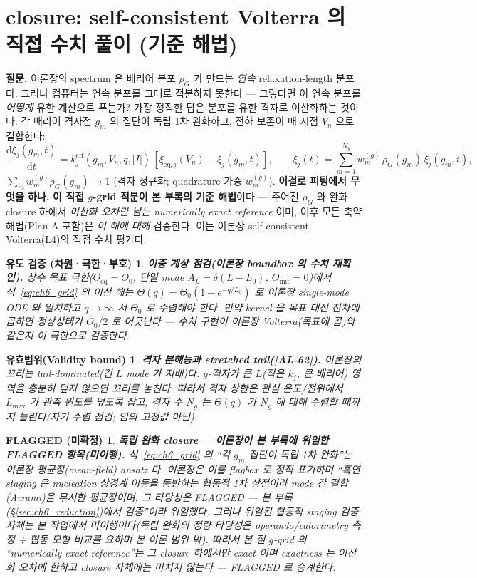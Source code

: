 \documentclass[11pt,a4paper]{article}
\newtheorem*{boundbox}{유효범위(Validity bound)}
\newtheorem*{flagbox}{FLAGGED (미확정)}
\newtheorem*{verifybox}{유도 검증 (차원·극한·부호)}
\newcommand{\dd}{\mathrm{d}}
\newcommand{\eff}{\mathrm{eff}}
\newcommand{\eq}{\mathrm{eq}}
\newcommand{\AL}[1]{\textsf{[AL-#1]}}
\begin{document}
\section{closure: self-consistent Volterra 의 직접 수치 풀이 (기준 해법)}\label{sec:ch6_grid}
\textbf{질문.} 이론장의 spectrum 은 배리어 분포 $\rho_G$ 가 만드는 \emph{연속} relaxation-length 분포다. 그러나
컴퓨터는 연속 분포를 그대로 적분하지 못한다 — 그렇다면 이 연속 분포를 \emph{어떻게} 유한 계산으로 푸는가? 가장
정직한 답은 분포를 유한 격자로 이산화하는 것이다. 각 배리어 격자점 $g_m$ 의 집단이 독립 1차 완화하고, 전하
보존이 매 시점 $V_n$ 으로 결합한다:
\begin{equation}
\frac{\dd\xi_j(g_m,t)}{\dd t}=k_j^{\eff}(g_m,V_n,q,|I|)\,[\xi_{\eq,j}(V_n)-\xi_j(g_m,t)],\qquad
\xi_j(t)=\sum_{m=1}^{N_g}w_m^{(g)}\,\rho_G(g_m)\,\xi_j(g_m,t),
\label{eq:ch6_grid}
\end{equation}
$\sum_m w_m^{(g)}\rho_G(g_m)\to1$ (격자 정규화; quadrature 가중 $w_m^{(g)}$).
\textbf{이걸로 피팅에서 무엇을 하나.} \textbf{이 직접 $g$-grid 적분이 본 부록의 기준 해법}이다 — 주어진
$\rho_G$ 와 완화 closure 하에서 \emph{이산화 오차만 남는 numerically exact reference} 이며, 이후 모든 축약
해법(Plan A 포함)은 \emph{이 해에 대해} 검증한다. 이는 이론장 self-consistent Volterra(L4)의 직접 수치 평가다.
\begin{verifybox}
\textbf{이중 계상 점검(이론장 boundbox 의 수치 재확인).} 상수 목표 극한($\Theta_\eq=\Theta_0$, 단일 mode
$A_L=\delta(L-L_0)$, $\Theta_\mathrm{init}=0$)에서 식~\eqref{eq:ch6_grid} 의 이산 해는 $\Theta(q)=\Theta_0
(1-e^{-q/L_0})$ 로 이론장 single-mode ODE 와 일치하고 $q\to\infty$ 서 $\Theta_0$ 로 수렴해야 한다. 만약 kernel 을
\emph{목표} 대신 \emph{잔차}에 곱하면 정상상태가 $\Theta_0/2$ 로 어긋난다 — 수치 구현이 이론장 Volterra(목표에
곱)와 같은지 이 극한으로 검증한다.
\end{verifybox}
\begin{boundbox}
\textbf{격자 분해능과 stretched tail(\AL{62}).} 이론장의 꼬리는 \emph{tail-dominated}(긴 $L$ mode 가 지배)다.
$g$-격자가 큰 $L$(작은 $k_j$, 큰 배리어) 영역을 충분히 덮지 않으면 꼬리를 놓친다. 따라서 격자 상한은 관심
온도/전위에서 $L_{\max}$ 가 관측 윈도를 덮도록 잡고, 격자 수 $N_g$ 는 $\Theta(q)$ 가 $N_g$ 에 대해 수렴할 때까지
늘린다(자기 수렴 점검; 임의 고정값 아님).
\end{boundbox}
\begin{flagbox}
\textbf{독립 완화 closure = 이론장이 본 부록에 위임한 FLAGGED 항목(미이행).} 식~\eqref{eq:ch6_grid} 의 ``각 $g_m$
집단이 \emph{독립} 1차 완화''는 이론장 평균장(mean-field) ansatz 다. 이론장은 이를 flagbox 로 정직 표기하며
``흑연 staging 은 nucleation$\cdot$상경계 이동을 동반하는 \emph{협동적} 1차 상전이라 mode 간 결합(Avrami)을 무시한
평균장이며, 그 타당성은 FLAGGED — 본 부록(\S\ref{sec:ch6_reduction})에서 검증''이라 위임했다. 그러나 위임된
\emph{협동적 staging 검증 자체는 본 작업에서 미이행}이다(독립 완화의 정량 타당성은 operando/calorimetry 측정 +
협동 모형 비교를 요하며 본 이론 범위 밖). 따라서 본 절 $g$-grid 의 ``numerically exact reference''는 그 closure
\emph{하에서만} exact 이며 \emph{exactness 는 이산화 오차에 한하고 closure 자체에는 미치지 않는다} — FLAGGED 로
승계한다.
\end{flagbox}
\end{document}

